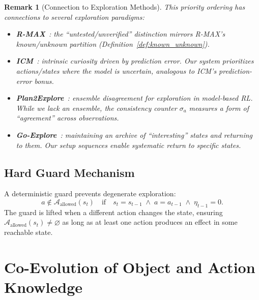 \documentclass{article}
\newtheorem{remark}{Remark}
\newcommand{\calA}{\mathcal{A}}
\begin{document}
\begin{remark}[Connection to Exploration Methods]
This priority ordering has connections to several exploration paradigms:
\begin{itemize}[nosep]
    \item \textbf{R-MAX}~\cite{brafman2002rmax}: the ``untested/unverified'' distinction mirrors R-MAX's known/unknown partition (Definition~\ref{def:known_unknown}).
    \item \textbf{ICM}~\cite{pathak2017curiosity}: intrinsic curiosity driven by prediction error.  Our system prioritizes actions/states where the model is uncertain, analogous to ICM's prediction-error bonus.
    \item \textbf{Plan2Explore}~\cite{sekar2020planning}: ensemble disagreement for exploration in model-based RL.  While we lack an ensemble, the consistency counter $\sigma_a$ measures a form of ``agreement'' across observations.
    \item \textbf{Go-Explore}~\cite{ecoffet2021first}: maintaining an archive of ``interesting'' states and returning to them.  Our setup sequences enable systematic return to specific states.
\end{itemize}
\end{remark}

\subsection{Hard Guard Mechanism}
\label{sec:guard}

A deterministic guard prevents degenerate exploration:
\begin{equation}
\label{eq:guard}
a \notin \calA_{\text{allowed}}(s_t) \quad \text{if} \quad s_t = s_{t-1} \;\wedge\; a = a_{t-1} \;\wedge\; \eta_{t-1} = 0.
\end{equation}
The guard is lifted when a different action changes the state, ensuring $\calA_{\text{allowed}}(s_t) \neq \varnothing$ as long as at least one action produces an effect in some reachable state.



\section{Co-Evolution of Object and Action Knowledge}
\label{sec:coevolution}
\end{document}

